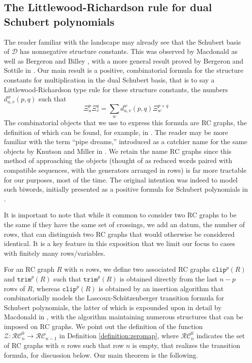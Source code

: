 \documentclass{amsart}
\theoremstyle{definition}
\theoremstyle{remark}
\numberwithin{equation}{subsection}
\newcommand{\trm}{\mathtt{trim}}
\newcommand{\zeromap}{\mathcal{Z}}
\newcommand{\clp}{\mathtt{clip}}
\newcommand{\RC}{\mathcal{RC}}
\newcommand{\dsch}{\ensuremath{\Xi}}
\newcommand{\dcoma}{\mathcal{D}}
\begin{document}
\subsection*{The Littlewood-Richardson rule for dual Schubert polynomials} The reader familiar with the landscape may already see that the Schubert basis of $\dcoma$ has nonnegative structure constants. This was observed by Macdonald \cite{notes} as well as Bergeron and Billey \cite{bbrc}, with a more general result proved by Bergeron and Sottile in \cite{coprod}. Our main result is a positive, combinatorial formula for the structure constants for multiplication in the dual Schubert basis, that is to say a Littlewood-Richardson type rule for these structure constants, the numbers $d_{u,v}^w(p, q)$ such that 
$$\dsch_u^p\dsch_v^q = \sum_{w} d_{u,v}^w(p, q)\dsch_w^{p+q}$$
The combinatorial objects that we use to express this formula are RC graphs, the definition of which can be found, for example, in \cite{bbrc}. The reader may be more familiar with the term ``pipe dreams,'' introduced as a catchier name for the same objects by Knutson and Miller in \cite{knutson2005grobner}. We retain the name RC graphs since this method of approaching the objects (thought of as reduced words paired with compatible sequences, with the generators arranged in rows) is far more tractable for our purposes, most of the time. The original intention was indeed to model such biwords, initially presented as a positive formula for Schubert polynomials in \cite{bjs}.

It is important to note that while it common to consider two RC graphs to be the same if they have the same set of crossings, we add an datum, the number of rows, that can distinguish two RC graphs that would otherwise be considered identical. It is a key feature in this exposition that we limit our focus to cases with finitely many rows/variables.

For an RC graph $R$ with $n$ rows, we define two associated RC graphs $\clp^p(R)$ and $\trm^p(R)$ such that $\trm^p(R)$ is obtained directly from the last $n - p$ rows of $R$, whereas $\clp^p(R)$ is obtained by an insertion algorithm that combinatorially models the Lascoux-Schützenberger transition formula for Schubert polynomials, the latter of which is expounded upon in detail by Macdonald in \cite{notes}, with the algorithm maintaining numerous structures that can be imposed on RC graphs. We point out the definition of the function $\zeromap:\RC_n^0\to \RC_{n-1}$ in Definition \ref{definition:zeromap}, where $\RC_n^0$ indicates the set of RC graphs with $n$ rows such that row $n$ is empty, that realizes the transition formula, for discussion below.
 Our main theorem is the following.
\end{document}
